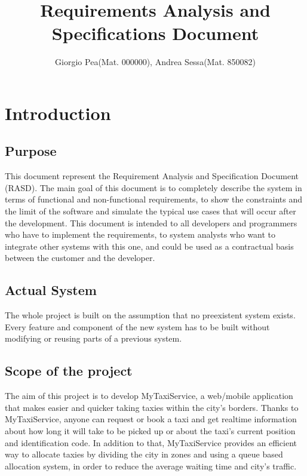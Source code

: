 \documentclass[11pt,titlepage]{article} %
\title{\textbf{R}equirements \textbf{A}nalysis and \textbf{S}pecifications \textbf{D}ocument}
\author{Giorgio Pea(Mat. 000000), Andrea Sessa(Mat. 850082)}
\date{} %
\begin{document}
\maketitle
\newpage

\tableofcontents

\newpage

\section{Introduction}
  \subsection{Purpose}
    This document represent the Requirement Analysis and Specification Document
    (RASD). The main goal of this document is to completely describe the system
    in terms of functional and non-functional requirements, to show the constraints and the limit
    of the software and simulate the typical use cases that will occur after the
    development. This document is intended to all developers and programmers who
    have to implement the requirements, to system analysts who want to integrate
    other systems with this one, and could be used as a contractual basis between
    the customer and the developer.

  \subsection{Actual System}
    The whole project is built on the assumption that no preexistent system exists.
    Every feature and component of the new system has to be built without modifying
    or reusing parts of a previous system.

  \subsection{Scope of the project}
    The aim of this project is to develop MyTaxiService, a web/mobile application that makes easier and quicker taking taxies
    within the city's borders.
    Thanks to MyTaxiService, anyone can request or book a taxi and get realtime information
    about how long it will take to be picked up or about the taxi's current position and identification
    code.
    In addition to that, MyTaxiService provides an efficient way to allocate taxies by dividing the
    city in zones and using a queue based allocation system, in order to reduce the average
    waiting time and city's traffic.
\end{document}
